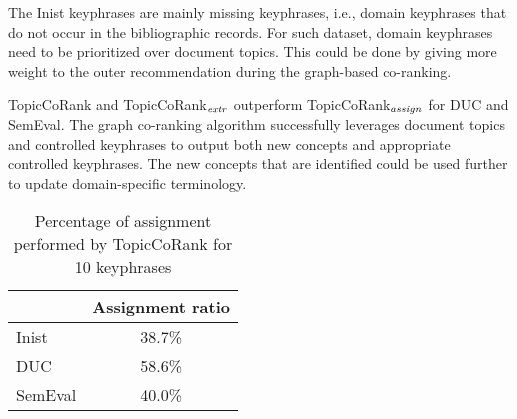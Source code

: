         The Inist keyphrases are mainly missing keyphrases, i.e., domain keyphrases that do not occur in the bibliographic records. 
        For such dataset, domain keyphrases need to be prioritized over document topics. This could be done by giving more weight to the outer recommendation during the graph-based co-ranking.
        
        TopicCoRank and TopicCoRank$_\textnormal{\textit{extr}}$ outperform TopicCoRank$_\textnormal{\textit{assign}}$ for DUC and SemEval.
        The graph co-ranking algorithm successfully leverages document topics and
        controlled keyphrases to output both new concepts and appropriate controlled keyphrases.
        The new concepts that are identified could be used further to update domain-specific terminology.

        \begin{table}[!h]
          \centering
          \begin{tabular}{l|c}
              \toprule
              & Assignment ratio\\
              \hline
              Inist & 38.7\%\\
              DUC & 58.6\%\\
              SemEval & 40.0\%\\
              \bottomrule
          \end{tabular}
          \caption{Percentage of assignment performed by TopicCoRank for 10 keyphrases
                   \label{tab:assignment_ratio}}
        \end{table}
        
